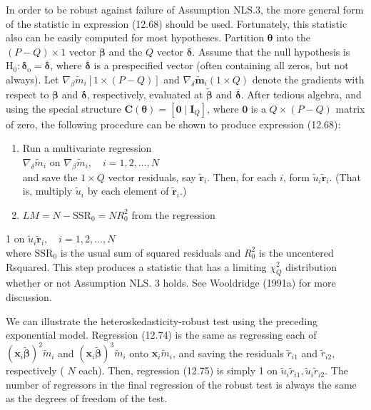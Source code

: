\documentclass[10pt]{article}
\begin{document}
In order to be robust against failure of Assumption NLS.3, the more general form of the statistic in expression (12.68) should be used. Fortunately, this statistic also can be easily computed for most hypotheses. Partition $\boldsymbol{\theta}$ into the $(P-Q) \times 1$ vector $\boldsymbol{\beta}$ and the $Q$ vector $\boldsymbol{\delta}$. Assume that the null hypothesis is $\mathrm{H}_{0}: \boldsymbol{\delta}_{\mathrm{o}}=\overline{\boldsymbol{\delta}}$, where $\overline{\boldsymbol{\delta}}$ is a prespecified vector (often containing all zeros, but not always). Let $\nabla_{\beta} \tilde{m}_{i} [1 \times(P-Q)]$ and $\nabla_{\delta} \tilde{\boldsymbol{m}}_{i}(1 \times Q)$ denote the gradients with respect to $\boldsymbol{\beta}$ and $\boldsymbol{\delta}$, respectively, evaluated at $\tilde{\boldsymbol{\beta}}$ and $\overline{\boldsymbol{\delta}}$. After tedious algebra, and using the special structure $\mathbf{C}(\boldsymbol{\theta})=\left[\mathbf{0} \mid \mathbf{I}_{Q}\right]$, where $\mathbf{0}$ is a $Q \times(P-Q)$ matrix of zero, the following procedure can be shown to produce expression (12.68):

\begin{enumerate}
  \item Run a multivariate regression\\
$\nabla_{\delta} \tilde{m}_{i}$ on $\nabla_{\beta} \tilde{m}_{i}, \quad i=1,2, \ldots, N$\\
and save the $1 \times Q$ vector residuals, say $\tilde{\mathbf{r}}_{i}$. Then, for each $i$, form $\tilde{u}_{i} \tilde{\mathbf{r}}_{i}$. (That is, multiply $\tilde{u}_{i}$ by each element of $\tilde{\mathbf{r}}_{i}$.)
  \item $L M=N-\mathrm{SSR}_{0}=N R_{0}^{2}$ from the regression
\end{enumerate}

1 on $\tilde{u}_{i} \tilde{\mathbf{r}}_{i}, \quad i=1,2, \ldots, N$\\
where $\mathrm{SSR}_{0}$ is the usual sum of squared residuals and $R_{0}^{2}$ is the uncentered Rsquared. This step produces a statistic that has a limiting $\chi_{Q}^{2}$ distribution whether or not Assumption NLS. 3 holds. See Wooldridge (1991a) for more discussion.

We can illustrate the heteroskedasticity-robust test using the preceding exponential model. Regression (12.74) is the same as regressing each of $\left(\mathbf{x}_{i} \tilde{\boldsymbol{\beta}}\right)^{2} \tilde{m}_{i}$ and $\left(\mathbf{x}_{i} \tilde{\boldsymbol{\beta}}\right)^{3} \tilde{m}_{i}$ onto $\mathbf{x}_{i} \tilde{m}_{i}$, and saving the residuals $\tilde{r}_{i 1}$ and $\tilde{r}_{i 2}$, respectively ( $N$ each). Then, regression (12.75) is simply 1 on $\tilde{u}_{i} \tilde{r}_{i 1}, \tilde{u}_{i} \tilde{r}_{i 2}$. The number of regressors in the final regression of the robust test is always the same as the degrees of freedom of the test.
\end{document}
